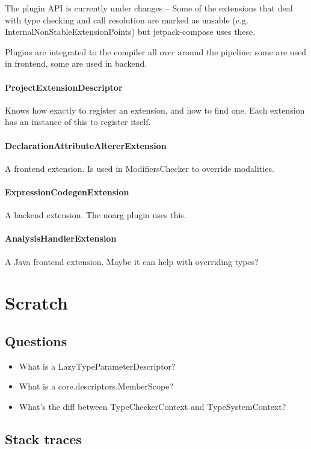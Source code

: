 \documentclass{article}
\begin{document}
The plugin API is currently under changes -- Some of the extensions that deal with type checking and call resolution are marked as unsable (e.g. InternalNonStableExtensionPoints) but jetpack-compose uses these.

Plugins are integrated to the compiler all over around the pipeline: some are used in frontend, some are used in backend.

\paragraph{ProjectExtensionDescriptor} Knows how exactly to register an extension, and how to find one. Each extension has an instance of this to register itself.

\paragraph{DeclarationAttributeAltererExtension} A frontend extension. Is used in ModifiersChecker to override modalities.

\paragraph{ExpressionCodegenExtension}
A backend extension. The noarg plugin uses this. 

\paragraph{AnalysisHandlerExtension}
A Java frontend extension. Maybe it can help with overriding types?

\section{Scratch}

\subsection{Questions}

\begin{itemize}
    \item What is a LazyTypeParameterDescriptor?
    \item What is a core.descriptors.MemberScope?
    \item What's the diff between TypeCheckerContext and TypeSystemContext?
\end{itemize}

\subsection{Stack traces}
\end{document}
